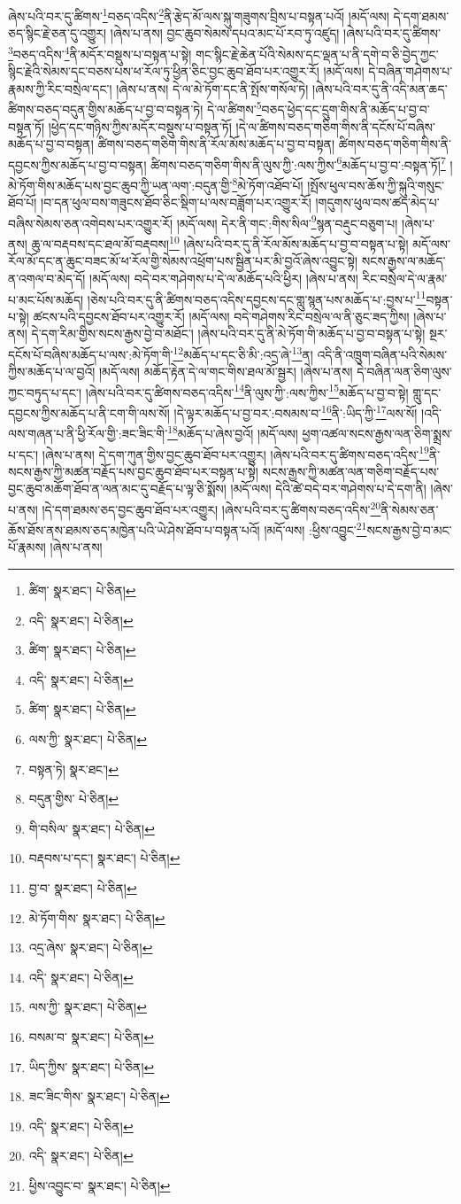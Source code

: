 ཞེས་པའི་བར་དུ་ཚིགས་\footnote{ཚིག་  སྣར་ཐང་།  པེ་ཅིན། }བཅད་འདིས་\footnote{འདི་  སྣར་ཐང་།  པེ་ཅིན། }ནི་རྩེད་མོ་ལས་སྐུ་གཟུགས་བྲིས་པ་བསྟན་པའོ། །མདོ་ལས། དེ་དག་ཐམས་ཅད་སྙིང་རྗེ་ཅན་དུ་འགྱུར། །ཞེས་པ་ནས། བྱང་ཆུབ་སེམས་དཔའ་མང་པོ་རབ་ཏུ་འཛུད། །ཞེས་པའི་བར་དུ་ཚིགས་\footnote{ཚིག་  སྣར་ཐང་།  པེ་ཅིན། }བཅད་འདིས་\footnote{འདི་  སྣར་ཐང་།  པེ་ཅིན། }ནི་མདོར་བསྡུས་པ་བསྟན་པ་སྟེ། གང་སྙིང་རྗེ་ཆེན་པོའི་སེམས་དང་ལྡན་པ་ནི་དགེ་བ་ཅི་བྱེད་ཀྱང་སྙིང་རྗེའི་སེམས་དང་བཅས་པས་ཕ་རོལ་ཏུ་ཕྱིན་ཅིང་བྱང་ཆུབ་ཐོབ་པར་འགྱུར་རོ། །མདོ་ལས། དེ་བཞིན་གཤེགས་པ་རྣམས་ཀྱི་རིང་བསྲེལ་དང་། །ཞེས་པ་ནས། དེ་ལ་མེ་ཏོག་དང་ནི་སྤོས་གསོལ་ཏེ། །ཞེས་པའི་བར་དུ་ནི་འདི་མན་ཆད་ཚིགས་བཅད་བདུན་གྱིས་མཆོད་པ་བྱ་བ་བསྟན་ཏེ། དེ་ལ་ཚིགས་\footnote{ཚིག་  སྣར་ཐང་།  པེ་ཅིན། }བཅད་ཕྱེད་དང་དྲུག་གིས་ནི་མཆོད་པ་བྱ་བ་བསྟན་ཏོ། །ཕྱེད་དང་གཉིས་ཀྱིས་མདོར་བསྡུས་པ་བསྟན་ཏོ། །དེ་ལ་ཚིགས་བཅད་གཅིག་གིས་ནི་དངོས་པོ་བཞིས་མཆོད་པ་བྱ་བ་བསྟན། ཚིགས་བཅད་གཅིག་གིས་ནི་རོལ་མོས་མཆོད་པ་བྱ་བ་བསྟན། ཚིགས་བཅད་གཅིག་གིས་ནི་དབྱངས་ཀྱིས་མཆོད་པ་བྱ་བ་བསྟན། ཚིགས་བཅད་གཅིག་གིས་ནི་ལུས་ཀྱི་:ལས་ཀྱིས་\footnote{ལས་ཀྱི་  སྣར་ཐང་།  པེ་ཅིན། }མཆོད་པ་བྱ་བ་:བསྟན་ཏོ།\footnote{བསྟན་ཏེ།  སྣར་ཐང་། } །མེ་ཏོག་གིས་མཆོད་པས་བྱང་ཆུབ་ཀྱི་ཡན་ལག་:བདུན་གྱི་\footnote{བདུན་གྱིས་  པེ་ཅིན། }མེ་ཏོག་འཐོབ་པོ། །སྤོས་ཕུལ་བས་ཆོས་ཀྱི་སྐུའི་གསུང་ཐོབ་པོ། །བ་དན་ཕུལ་བས་གཟུངས་ཐོབ་ཅིང་སྡིག་པ་ལས་བཟློག་པར་འགྱུར་རོ། །གདུགས་ཕུལ་བས་ཚད་མེད་པ་བཞིས་སེམས་ཅན་འགེབས་པར་འགྱུར་རོ། །མདོ་ལས། དེར་ནི་གང་:གིས་སིལ་\footnote{གི་བསིལ་  སྣར་ཐང་།  པེ་ཅིན། }སྙན་བརྡུང་བཅུག་པ། །ཞེས་པ་ནས། ཆུ་ལ་བརྡབས་དང་ཐལ་མོ་བརྡབས།\footnote{བརྡབས་པ་དང་།  སྣར་ཐང་།  པེ་ཅིན། } །ཞེས་པའི་བར་དུ་ནི་རོལ་མོས་མཆོད་པ་བྱ་བ་བསྟན་པ་སྟེ། མདོ་ལས་རོལ་མོ་དང་ན་ཆུང་བཟང་མོ་ཕ་རོལ་གྱི་སེམས་འཕྲོག་པས་སྦྱིན་པར་མི་བྱའོ་ཞེས་འབྱུང་སྟེ། སངས་རྒྱས་ལ་མཆོད་ན་འགལ་བ་མེད་དོ། །མདོ་ལས། བདེ་བར་གཤེགས་པ་དེ་ལ་མཆོད་པའི་ཕྱིར། །ཞེས་པ་ནས། རིང་བསྲེལ་དེ་ལ་རྣམ་པ་མང་པོས་མཆོད། །ཅེས་པའི་བར་དུ་ནི་ཚིགས་བཅད་འདིས་དབྱངས་དང་གླུ་སྙན་པས་མཆོད་པ་:བྱས་པ་\footnote{བྱ་བ་  སྣར་ཐང་།  པེ་ཅིན། }བསྟན་པ་སྟེ། ཚངས་པའི་དབྱངས་ཐོབ་པར་འགྱུར་རོ། །མདོ་ལས། བདེ་གཤེགས་རིང་བསྲེལ་ལ་ནི་ཅུང་ཟད་ཀྱིས། །ཞེས་པ་ནས། དེ་དག་རིམ་གྱིས་སངས་རྒྱས་བྱེ་བ་མཐོང་། །ཞེས་པའི་བར་དུ་ནི་མེ་ཏོག་གི་མཆོད་པ་བྱ་བ་བསྟན་པ་སྟེ། སྔར་དངོས་པོ་བཞིས་མཆོད་པ་ལས་:མེ་ཏོག་གི་\footnote{མེ་ཏོག་གིས་  སྣར་ཐང་།  པེ་ཅིན། }མཆོད་པ་དང་ཅི་མི་:འདྲ་ཞེ་\footnote{འདྲ་ཞེས་  སྣར་ཐང་།  པེ་ཅིན། }ན། འདི་ནི་འཁྲུག་བཞིན་པའི་སེམས་ཀྱིས་མཆོད་པ་ལ་བྱའོ། །མདོ་ལས། མཆོད་རྟེན་དེ་ལ་གང་གིས་ཐལ་མོ་སྦྱར། །ཞེས་པ་ནས། དེ་བཞིན་ལན་ཅིག་ལུས་ཀྱང་བཏུད་པ་དང་། །ཞེས་པའི་བར་དུ་ཚིགས་བཅད་འདིས་\footnote{འདི་  སྣར་ཐང་།  པེ་ཅིན། }ནི་ལུས་ཀྱི་:ལས་ཀྱིས་\footnote{ལས་ཀྱི་  སྣར་ཐང་།  པེ་ཅིན། }མཆོད་པ་བྱ་བ་སྟེ། གླུ་དང་དབྱངས་ཀྱིས་མཆོད་པ་ནི་ངག་གི་ལས་སོ། །དེ་ལྟར་མཆོད་པ་བྱ་བར་:བསམས་བ་\footnote{བསམ་བ་  སྣར་ཐང་།  པེ་ཅིན། }ནི་:ཡིད་ཀྱི་\footnote{ཡིད་ཀྱིས་  སྣར་ཐང་།  པེ་ཅིན། }ལས་སོ། །འདི་ལས་གཞན་པ་ནི་ཕྱི་རོལ་གྱི་:ཟང་ཟིང་གི་\footnote{ཟང་ཟིང་གིས་  སྣར་ཐང་།  པེ་ཅིན། }མཆོད་པ་ཞེས་བྱའོ། །མདོ་ལས། ཕྱག་འཚལ་སངས་རྒྱས་ལན་ཅིག་སྨྲས་པ་དང་། །ཞེས་པ་ནས། དེ་དག་ཀུན་གྱིས་བྱང་ཆུབ་ཐོབ་པར་འགྱུར། །ཞེས་པའི་བར་དུ་ཚིགས་བཅད་འདིས་\footnote{འདི་  སྣར་ཐང་།  པེ་ཅིན། }ནི་སངས་རྒྱས་ཀྱི་མཚན་བརྗོད་པས་བྱང་ཆུབ་ཐོབ་པར་བསྟན་པ་སྟེ། སངས་རྒྱས་ཀྱི་མཚན་ལན་གཅིག་བརྗོད་པས་བྱང་ཆུབ་མཆོག་ཐོབ་ན་ལན་མང་དུ་བརྗོད་པ་ལྟ་ཅི་སྨོས། །མདོ་ལས། དེའི་ཚེ་བདེ་བར་གཤེགས་པ་དེ་དག་ནི། །ཞེས་པ་ནས། །དེ་དག་ཐམས་ཅད་བྱང་ཆུབ་ཐོབ་པར་འགྱུར། །ཞེས་པའི་བར་དུ་ཚིགས་བཅད་འདིས་\footnote{འདི་  སྣར་ཐང་།  པེ་ཅིན། }ནི་སེམས་ཅན་ཆོས་ཐོས་ནས་ཐམས་ཅད་མཁྱེན་པའི་ཡེ་ཤེས་ཐོབ་པ་བསྟན་པའོ། །མདོ་ལས། :ཕྱིས་འབྱུང་\footnote{ཕྱིས་འབྱུང་བ་  སྣར་ཐང་།  པེ་ཅིན། }སངས་རྒྱས་བྱེ་བ་མང་པོ་རྣམས། །ཞེས་པ་ནས། 